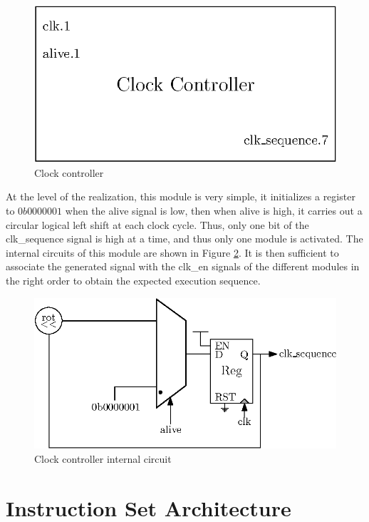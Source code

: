 \begin{figure}[H]
    \centering
    \includegraphics[scale=0.8]{Chapter3-CPU/res/clock_controller}
    \caption{Clock controller}
    \label{fig:components/cc}
\end{figure}

At the level of the realization, this module is very simple, it initializes a register to 
$0b0000001$ when the alive signal is low, then when alive is high, it carries out a circular logical 
left shift at each clock cycle. Thus, only one bit of the clk\_sequence signal is high at a time, 
and thus only one module is activated. The internal circuits of this module are shown in Figure 
\ref{fig:components/cc_in}. It is then sufficient to associate the generated signal with the clk\_en 
signals of the different modules in the right order to obtain the expected execution sequence.

\begin{figure}[H]
    \centering
    \includegraphics[scale=1.0]{Chapter3-CPU/res/clock_controller_in}
    \caption{Clock controller internal circuit}
    \label{fig:components/cc_in}
\end{figure}


\section{Instruction Set Architecture}
